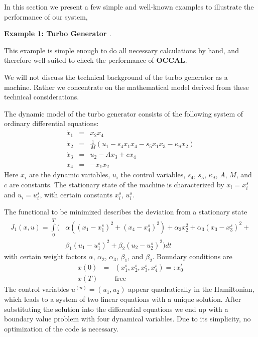 \documentclass[12pt,a4paper]{article}
\newcommand{\OCCAL}{{\sf\bf OCCAL}}
\begin{document}
\label{sec:examples}

In this section we present a few simple and well-known examples to
illustrate the performance of our system,

\vspace*{3mm}\noindent
{\bf Example 1: Turbo Generator \cite{Wulkow}}.

This example is simple enough to do all necessary calculations by
hand, and therefore well-suited to check the performance of \OCCAL{}.

We will not discuss the technical background of the turbo generator as
a machine. Rather we concentrate on the mathematical model derived
from these technical considerations.

The dynamic model of the turbo generator consists of the following system of
ordinary differential equations:
\begin{eqnarray}
  \dot x_{1} &=& x_{2} x_{4} \nonumber \\
  \dot x_{2} &=& \frac{1}{M} (u_{1} - s_{4} x_{1} x_{4} - s_{5} x_{1}
                  x_{3} - \kappa_{d} x_{2}) \nonumber \\
  \dot x_{3} &=& u_{2} - A x_{3} + c x_{4} \nonumber \\
  \dot x_{4} &=& - x_{1} x_{2}
\end{eqnarray}
Here $x_{i}$ are the dynamic variables, $u_{i}$ the control variables,
$s_{4}$, $s_{5}$, $\kappa_{d}$, $A$, $M$, and $c$ are constants.  The
stationary state of the machine is characterized by $x_{i} =
x_{i}^{s}$ and $u_{i}=u_{i}^{s}$, with certain constants $x_{i}^{s}$,
$u_{i}^{s}$.

The functional to be minimized describes the deviation from a
stationary state
\begin{equation}
  \begin{split}
  J_{1}(x,u) = \int\limits_{0}^{T} 
                (& \alpha ((x_{1} - x_{1}^{s})^{2} +
                          (x_{4} - x_{4}^{s})^{2}) +
                  \alpha_{2} x_{2}^{2} +
                  \alpha_{3} (x_{3} - x_{3}^{s})^{2} + \\
              &    \beta_{1} (u_{1} - u_{1}^{s})^{2} +
                  \beta_{2} (u_{2} - u_{2}^{s})^{2}) dt
  \end{split}
\end{equation}
with certain weight factors $\alpha$, $\alpha_{2}$, $\alpha_{3}$,
$\beta_{1}$, and $\beta_{2}$.  Boundary conditions are 
\begin{eqnarray}
  x(0) &=& (x_{1}^{s}, x_{2}^{s}, x_{3}^{s}, x_{4}^{s}) =: x_{0}^{t} \\
  x(T) && \mbox{free}
\end{eqnarray}
The control variables $u^{(n)} = (u_{1},u_{2})$ appear quadratically in
the Hamiltonian, which leads to a system of two linear equations with
a unique solution. After substituting the solution into the
differential equations we end up with a boundary value problem with
four dynamical variables. Due to its simplicity, no optimization of
the code is necessary.
\end{document}
